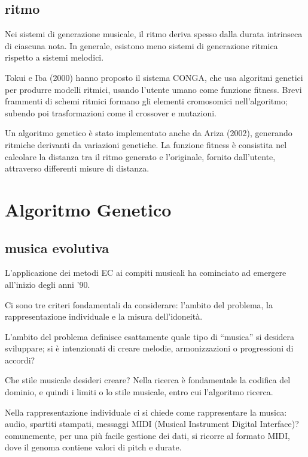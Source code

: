 \documentclass[a4paper,12pt]{report}
\begin{document}
\subsection{ritmo}

Nei sistemi di generazione musicale, il ritmo deriva spesso dalla durata intrinseca di ciascuna nota. 
In generale, esistono meno sistemi di generazione ritmica rispetto a sistemi melodici.

Tokui e Iba (2000) hanno proposto il sistema CONGA, che usa algoritmi genetici per produrre modelli ritmici, usando l'utente umano come funzione fitness.
Brevi frammenti di schemi ritmici formano gli elementi cromosomici nell'algoritmo; subendo poi trasformazioni come il crossover e mutazioni. 

Un algoritmo genetico è stato implementato anche da Ariza (2002), generando ritmiche derivanti da variazioni genetiche.
La funzione fitness è consistita nel calcolare la distanza tra il ritmo generato e l'originale, fornito dall'utente, attraverso differenti misure di distanza. 

\section{Algoritmo Genetico}

\subsection{musica evolutiva}

L'applicazione dei metodi EC ai compiti musicali ha cominciato ad emergere all'inizio degli anni '90.

Ci sono tre criteri fondamentali da considerare: l'ambito del problema, la rappresentazione individuale e la misura dell'idoneità. 

L’ambito del problema definisce esattamente quale tipo di “musica” si desidera sviluppare; si è intenzionati di creare melodie, armonizzazioni o progressioni di accordi? 

Che stile musicale desideri creare? 
Nella ricerca è fondamentale la codifica del dominio, e quindi i limiti o lo stile musicale, entro cui l'algoritmo ricerca. 

Nella rappresentazione individuale ci si chiede come rappresentare la musica: audio, spartiti stampati, messaggi MIDI (Musical Instrument Digital Interface)? 
comunemente, per una più facile gestione dei dati, si ricorre al formato MIDI, dove il genoma contiene valori di pitch e durate. 
\end{document}
